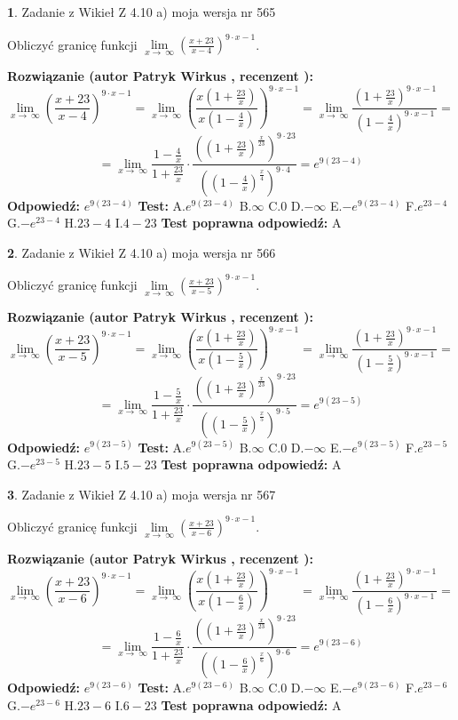 \documentclass[12pt, a4paper]{article}
\theoremstyle{definition} %
\newtheorem{zad}{}
\newcommand{\zadStart}[1]{\begin{zad}#1\newline}
\newcommand{\zadStop}{\end{zad}}
\newcommand{\rozwStart}[2]{\noindent \textbf{Rozwiązanie (autor #1 , recenzent #2): }\newline}
\newcommand{\rozwStop}{\newline}
\newcommand{\odpStart}{\noindent \textbf{Odpowiedź:}\newline}
\newcommand{\odpStop}{\newline}
\newcommand{\testStart}{\noindent \textbf{Test:}\newline}
\newcommand{\testStop}{\newline}
\newcommand{\kluczStart}{\noindent \textbf{Test poprawna odpowiedź:}\newline}
\newcommand{\kluczStop}{\newline}
\begin{document}
\zadStart{Zadanie z Wikieł Z 4.10 a) moja wersja nr 565}


Obliczyć granicę funkcji  $\lim\limits_{x\to\ \infty}(\frac{x+23}{x-4})^{9\cdot x-1}$.
\zadStop
\rozwStart{Patryk Wirkus}{}
$$\lim\limits_{x\to\ \infty}(\frac{x+23}{x-4})^{9\cdot x-1} = \lim\limits_{x\to\ \infty}(\frac{x(1+\frac{23}{x})}{x(1-\frac{4}{x})})^{9\cdot x-1}=\lim\limits_{x\to\ \infty}\frac{(1+\frac{23}{x})^{9\cdot x-1}}{(1-\frac{4}{x})^{9\cdot x-1}}=$$
$$=\lim\limits_{x\to\ \infty}\frac{1-\frac{4}{x}}{1+\frac{23}{x}}\cdot\frac{((1+\frac{23}{x})^{\frac{x}{23}})^{9\cdot23}}{((1-\frac{4}{x})^{\frac{x}{4}})^{9\cdot4}}=e^{9(23-4)}$$
\rozwStop
\odpStart
$e^{9(23-4)}$
\odpStop
\testStart
A.$e^{9(23-4)}$ B.$\infty$ C.$0$ D.$-\infty$ E.$-e^{9(23-4)}$
F.$e^{23-4}$ G.$-e^{23-4}$
H.$23-4$
I.$4-23$
\testStop
\kluczStart
A
\kluczStop



\zadStart{Zadanie z Wikieł Z 4.10 a) moja wersja nr 566}


Obliczyć granicę funkcji  $\lim\limits_{x\to\ \infty}(\frac{x+23}{x-5})^{9\cdot x-1}$.
\zadStop
\rozwStart{Patryk Wirkus}{}
$$\lim\limits_{x\to\ \infty}(\frac{x+23}{x-5})^{9\cdot x-1} = \lim\limits_{x\to\ \infty}(\frac{x(1+\frac{23}{x})}{x(1-\frac{5}{x})})^{9\cdot x-1}=\lim\limits_{x\to\ \infty}\frac{(1+\frac{23}{x})^{9\cdot x-1}}{(1-\frac{5}{x})^{9\cdot x-1}}=$$
$$=\lim\limits_{x\to\ \infty}\frac{1-\frac{5}{x}}{1+\frac{23}{x}}\cdot\frac{((1+\frac{23}{x})^{\frac{x}{23}})^{9\cdot23}}{((1-\frac{5}{x})^{\frac{x}{5}})^{9\cdot5}}=e^{9(23-5)}$$
\rozwStop
\odpStart
$e^{9(23-5)}$
\odpStop
\testStart
A.$e^{9(23-5)}$ B.$\infty$ C.$0$ D.$-\infty$ E.$-e^{9(23-5)}$
F.$e^{23-5}$ G.$-e^{23-5}$
H.$23-5$
I.$5-23$
\testStop
\kluczStart
A
\kluczStop



\zadStart{Zadanie z Wikieł Z 4.10 a) moja wersja nr 567}


Obliczyć granicę funkcji  $\lim\limits_{x\to\ \infty}(\frac{x+23}{x-6})^{9\cdot x-1}$.
\zadStop
\rozwStart{Patryk Wirkus}{}
$$\lim\limits_{x\to\ \infty}(\frac{x+23}{x-6})^{9\cdot x-1} = \lim\limits_{x\to\ \infty}(\frac{x(1+\frac{23}{x})}{x(1-\frac{6}{x})})^{9\cdot x-1}=\lim\limits_{x\to\ \infty}\frac{(1+\frac{23}{x})^{9\cdot x-1}}{(1-\frac{6}{x})^{9\cdot x-1}}=$$
$$=\lim\limits_{x\to\ \infty}\frac{1-\frac{6}{x}}{1+\frac{23}{x}}\cdot\frac{((1+\frac{23}{x})^{\frac{x}{23}})^{9\cdot23}}{((1-\frac{6}{x})^{\frac{x}{6}})^{9\cdot6}}=e^{9(23-6)}$$
\rozwStop
\odpStart
$e^{9(23-6)}$
\odpStop
\testStart
A.$e^{9(23-6)}$ B.$\infty$ C.$0$ D.$-\infty$ E.$-e^{9(23-6)}$
F.$e^{23-6}$ G.$-e^{23-6}$
H.$23-6$
I.$6-23$
\testStop
\kluczStart
A
\kluczStop
\end{document}
